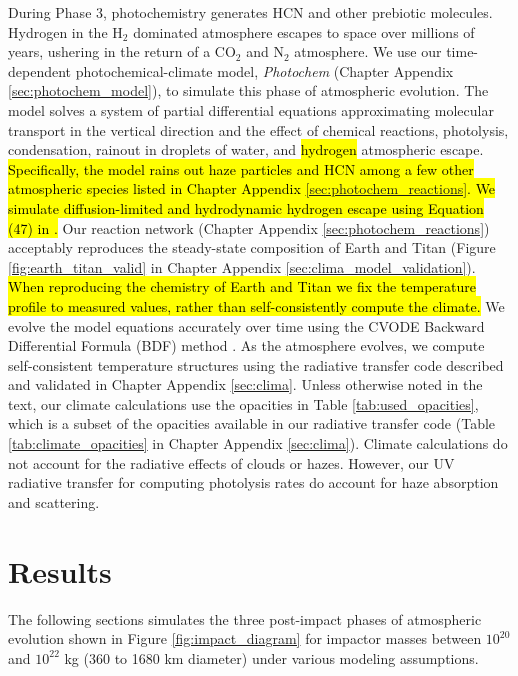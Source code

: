 During Phase 3, photochemistry generates HCN and other prebiotic molecules. Hydrogen in the H$_2$ dominated atmosphere escapes to space over millions of years, ushering in the return of a CO$_2$ and N$_2$ atmosphere. We use our time-dependent photochemical-climate model, \emph{Photochem} (Chapter Appendix \ref{sec:photochem_model}), to simulate this phase of atmospheric evolution. The model solves a system of partial differential equations approximating molecular transport in the vertical direction and the effect of chemical reactions, photolysis, condensation, rainout in droplets of water, and \hl{hydrogen} atmospheric escape. \hl{Specifically, the model rains out haze particles and HCN among a few other atmospheric species listed in Chapter Appendix \mbox{\ref{sec:photochem_reactions}}. We simulate diffusion-limited and hydrodynamic hydrogen escape using Equation (47) in \mbox{\citet{Zahnle_2020}}.} Our reaction network (Chapter Appendix \ref{sec:photochem_reactions}) acceptably reproduces the steady-state composition of Earth and Titan (Figure \ref{fig:earth_titan_valid} in Chapter Appendix \ref{sec:clima_model_validation}). \hl{When reproducing the chemistry of Earth and Titan we fix the temperature profile to measured values, rather than self-consistently compute the climate.} We evolve the model equations accurately over time using the CVODE Backward Differential Formula (BDF) method \citep{Hindmarsh_2005}. As the atmosphere evolves, we compute self-consistent temperature structures using the radiative transfer code described and validated in Chapter Appendix \ref{sec:clima}. Unless otherwise noted in the text, our climate calculations use the opacities in Table \ref{tab:used_opacities}, which is a subset of the opacities available in our radiative transfer code (Table \ref{tab:climate_opacities} in Chapter Appendix \ref{sec:clima}). Climate calculations do not account for the radiative effects of clouds or hazes. However, our UV radiative transfer for computing photolysis rates do account for haze absorption and scattering.

\section{Results}

The following sections simulates the three post-impact phases of atmospheric evolution shown in Figure \ref{fig:impact_diagram} for impactor masses between $10^{20}$ and $10^{22}$ kg (360 to 1680 km diameter) under various modeling assumptions.

